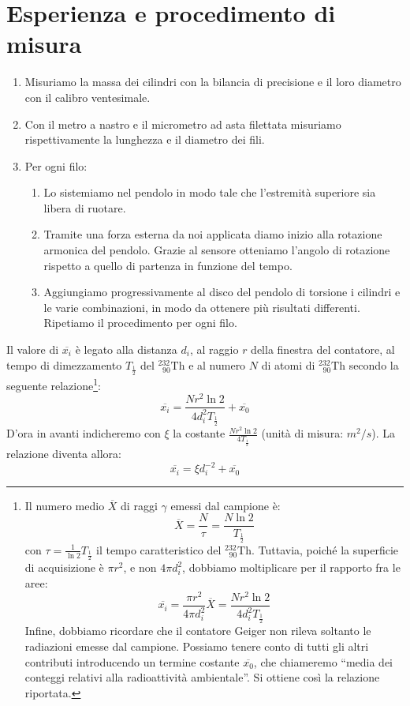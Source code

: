\documentclass{article}
\newcommand*{\Th}{^{232}_{\;\;90} \text{Th}}
\begin{document}
\section{Esperienza e procedimento di misura}

\begin{enumerate}
    \item
        Misuriamo la massa dei cilindri con la bilancia di precisione
        e il loro diametro con il calibro ventesimale.
    \item
        Con il metro a nastro e il micrometro ad asta filettata misuriamo
        rispettivamente la lunghezza e il diametro dei fili.
    \item Per ogni filo:
    \begin{enumerate}
        \item
            Lo sistemiamo nel pendolo in modo tale che l'estremità
            superiore sia libera di ruotare.
        \item
            Tramite una forza esterna da noi applicata diamo inizio
            alla rotazione armonica del pendolo.
            Grazie al sensore otteniamo l'angolo di rotazione rispetto
            a quello di partenza in funzione del tempo.
        \item
            Aggiungiamo progressivamente al disco del pendolo di torsione i cilindri e le varie combinazioni,
            in modo da ottenere più risultati differenti. Ripetiamo il procedimento per ogni filo.
    \end{enumerate}
\end{enumerate}








Il valore di $\overline{x_i}$ è legato alla distanza $d_i$, al raggio $r$
della finestra del contatore, al tempo di dimezzamento $T_\frac{1}{2}$ del
$\Th$ e al numero $N$ di atomi di $\Th$ secondo la seguente relazione\footnote{
    Il numero medio $\overline{X}$ di raggi $\gamma$ emessi dal campione è:
    \[
        \overline{X} = \frac{N}{\tau} = \frac{N\ln{2}}{T_\frac{1}{2}}
    \]
    con $\tau=\frac{1}{\ln{2}}T_\frac{1}{2}$ il tempo caratteristico del $\Th$.
    Tuttavia, poiché la superficie di acquisizione è $\pi r^2$, e non $4\pi d_i^2$,
    dobbiamo moltiplicare per il rapporto fra le aree:
    \[
        \overline{x_i} = \frac{\pi r^2}{4\pi d_i^2} \overline{X} =
        \frac{Nr^2\ln{2}}{4 d_i^2 T_\frac{1}{2}}
    \]
    Infine, dobbiamo ricordare che il contatore Geiger non rileva soltanto le
    radiazioni emesse dal campione. Possiamo tenere conto di tutti gli altri
    contributi introducendo un termine costante $\overline{x_0}$, che chiameremo
    “media dei conteggi relativi alla radioattività ambientale”.
    Si ottiene così la relazione riportata.
}:
\[
    \overline{x_i} = \frac{Nr^2\ln{2}}{4 d_i^2 T_\frac{1}{2}} + \overline{x_0}
\]
D'ora in avanti indicheremo con $\xi$ la costante $\frac{Nr^2\ln{2}}{4T_\frac{1}{2}}$
(unità di misura: $\unit{m^2\per s}$).
La relazione diventa allora:
\[\overline{x_i} = \xi d_i^{-2} + \overline{x_0}\]
\end{document}
